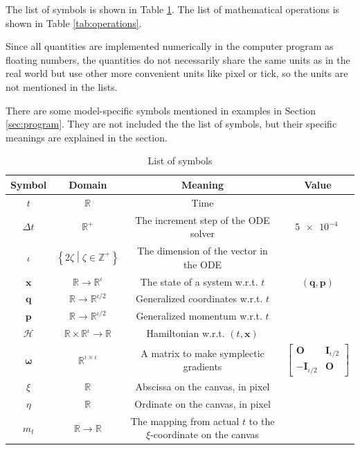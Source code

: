 \documentclass[12pt]{article}
\begin{document}
The list of symbols is shown in Table \ref{tab:symbols}.
The list of mathematical operations is shown in Table \ref{tab:operations}.

Since all quantities are implemented numerically in the computer program as floating numbers,
the quantities do not necessarily share the same units as in the real world
but use other more convenient units like pixel or tick,
so the units are not mentioned in the lists.

There are some model-specific symbols mentioned in examples in Section \ref{sec:program}.
They are not included the the list of symbols, but their specific meanings are explained in the section.

\begin{table}[h]
  \caption{List of symbols}
  \label{tab:symbols}
  \centering
  \begin{tabular}{cccc}
    Symbol & Domain & Meaning & Value\\
    \hline
    $t$ & $\mathbb R$ & Time\\
    $\Delta t$ & $\mathbb R^+$ & The increment step of the ODE solver & $\SI{5e-4}{}$\\
    $\iota$ & $\left\{2\zeta\middle|\zeta\in\mathbb Z^+\right\}$ & The dimension of the vector in the ODE\\
    $\mathbf x$ & $\mathbb R\rightarrow\mathbb R^\iota$ & The state of a system w.r.t. $t$ & $\left(\mathbf q,\mathbf p\right)$\\
    $\mathbf q$ & $\mathbb R\rightarrow\mathbb R^{\iota/2}$ & Generalized coordinates w.r.t. $t$\\
    $\mathbf p$ & $\mathbb R\rightarrow\mathbb R^{\iota/2}$ & Generalized momentum w.r.t. $t$\\
    $\mathcal H$ & $\mathbb R\times\mathbb R^\iota\rightarrow\mathbb R$ & Hamiltonian w.r.t. $\left(t,\mathbf x\right)$\\
    $\boldsymbol\omega$ & $\mathbb R^{\iota\times\iota}$ & A matrix to make symplectic gradients & $\left[\begin{matrix}
      \mathbf O & \mathbf I_{\iota/2}\\
      -\mathbf I_{\iota/2} & \mathbf O
    \end{matrix}\right]$\\
    $\xi$ & $\mathbb R$ & Abscissa on the canvas, in pixel\\
    $\eta$ & $\mathbb R$ & Ordinate on the canvas, in pixel\\
    $m_t$ & $\mathbb R\rightarrow\mathbb R$ & \makecell{The mapping from actual $t$\\to the $\xi$-coordinate on the canvas}\\

\end{tabular}
\end{table}
\end{document}
